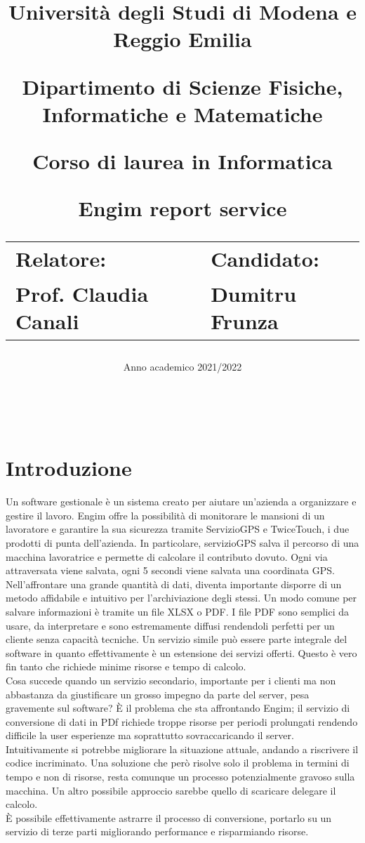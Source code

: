 \documentclass[12pt]{article}
\author{}
\title{
    \huge 
        \textbf{Università degli Studi di Modena e Reggio Emilia}
    \large
        \par Dipartimento di Scienze Fisiche, Informatiche e Matematiche
        \par Corso di laurea in Informatica
    \vfil
        \huge \par \textbf{Engim report service}
    \vfil
    \normalsize
    \begin{tabular}{lp{0.4\textwidth}l}
      Relatore: & & Candidato: \\
      Prof. Claudia Canali & &  Dumitru Frunza \\
      \end{tabular}
}
\date{Anno academico 2021/2022}
\begin{document}
\maketitle
\thispagestyle{empty}
\newpage 
\thispagestyle{empty}
\
\newpage
{}
\addtocounter{page}{0}
\listoffigures
\newpage
{}
\tableofcontents
{}
\newpage
{}
\addtocounter{page}{0}


\section*{Introduzione}
Un software gestionale è un sistema creato per aiutare un'azienda a organizzare 
e gestire il lavoro.
Engim offre la possibilità di monitorare le mansioni di un lavoratore e garantire 
la sua sicurezza tramite  ServizioGPS e TwiceTouch, i due prodotti di punta dell'azienda. 
In particolare, servizioGPS salva il percorso di una macchina lavoratrice e 
permette di calcolare il contributo dovuto. Ogni via attraversata viene salvata, 
ogni 5 secondi viene salvata una coordinata GPS.
\\ Nell'affrontare una grande quantità di dati, diventa importante
 disporre di un metodo affidabile e intuitivo per l'archiviazione degli stessi.
Un modo comune per salvare informazioni è tramite un file XLSX o PDF.
I file PDF sono semplici da usare, da interpretare e sono estremamente diffusi 
rendendoli perfetti per un cliente senza capacità tecniche. 
Un servizio simile può essere parte integrale del software in quanto effettivamente 
è un estensione dei servizi offerti. 
Questo è vero fin tanto che richiede minime risorse e tempo di calcolo.
\\ Cosa succede quando un servizio secondario, importante per i clienti ma non 
abbastanza da giustificare un grosso impegno da parte del server, pesa gravemente 
sul software? 
È il problema che sta affrontando Engim; il servizio di conversione di dati 
in PDf richiede troppe risorse per periodi prolungati rendendo difficile la user 
esperienze ma soprattutto sovraccaricando il server.
Intuitivamente si potrebbe migliorare la situazione attuale, andando a riscrivere 
il codice incriminato.
Una soluzione che però risolve solo il problema in termini di tempo e non di 
risorse, resta comunque un processo potenzialmente gravoso sulla macchina. 
Un altro possibile approccio sarebbe quello di scaricare delegare il calcolo.
\\ È possibile effettivamente astrarre il processo di conversione, portarlo su 
un servizio di terze parti migliorando performance e risparmiando risorse.
\end{document}
